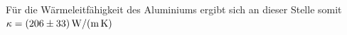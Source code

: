 Für die Wärmeleitfähigkeit des Aluminiums ergibt sich an dieser Stelle somit $\kappa = \SI{206 \pm 33}{\watt\per\meter\per\kelvin}  $

